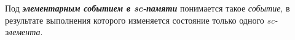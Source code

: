 Под \textbf{\textit{элементарным событием в sc-памяти}} понимается такое \textit{событие}, в результате выполнения которого изменяется состояние только одного \textit{sc-элемента}.


%
